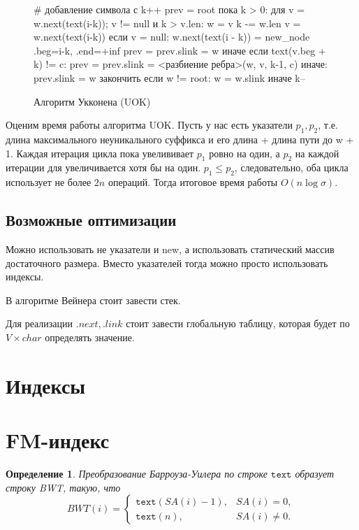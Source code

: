 \documentclass[10pt]{book}
\theoremstyle{plain}
\newtheorem{definition}{Определение}[section]
\newcommand{\textm}{\texttt{text}}
\newenvironment{figurem}[1][]
  {\begin{figure}[p]
  \caption{#1}
  \centering
  }
  {
  \end{figure}
  }
\begin{document}
\begin{figurem}[Алгоритм Укконена (UOK)]
\begin{verbm}
  # добавление символа с
  k++
  prev = root
  пока k > 0:
    для v = w.next(text(i-k)); v != null и k > v.len:
      w = v
      k -= w.len
      v = w.next(text(i-k))
    если v = null:
      w.next(text(i - k)) = new_node {.beg=i-k, .end=+inf}
      prev = prev.slink = w
    иначе если text(v.beg + k) != c:
      prev = prev.slink = <разбиение ребра>(w, v, k-1, c)
    иначе:
      prev.slink = w
      закончить
    если w != root: w = w.slink
    иначе k--
\end{verbm}
\end{figurem}

Оценим время работы алгоритма UOK. Пусть у нас есть указатели $p_1, p_2$, т.е.
длина максимального неуникального суффикса и его длина + длина пути до w + 1.
Каждая итерация цикла пока увелививает $p_1$ ровно на один, а $p_2$ на каждой
итерации для увеличивается хотя бы на один. $p_1 \le p_2$, следовательно, оба
цикла использует не более $2n$ операций. Тогда итоговое время работы
$O(n \log \sigma)$.

\subsection{Возможные оптимизации}

Можно использовать не указатели и new, а использовать статический массив
достаточного размера. Вместо указателей тогда можно просто использовать индексы.

В алгоритме Вейнера стоит завести стек.

Для реализации $.next, .link$ стоит завести глобальную таблицу, которая будет
по $V \times char$ определять значение.

\section{Индексы}

\section{FM-индекс}

\begin{definition}
  Преобразование Барроуза-Уилера по строке $\textm$ образует строку BWT, такую,
  что $$ BWT(i) = 
    \begin{cases}
      \textm(SA(i) - 1), &SA(i) = 0, \\
      \textm(n), &SA(i) \ne 0.
    \end{cases}$$
\end{definition}
\end{document}
